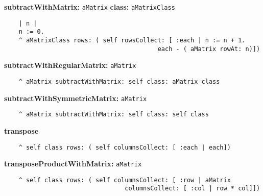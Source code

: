 {\bf subtractWithMatrix:} {\tt aMatrix} {\bf class:} {\tt aMatrixClass}
\begin{verbatim}
    | n |
    n := 0.
    ^ aMatrixClass rows: ( self rowsCollect: [ :each | n := n + 1. 
                                          each - ( aMatrix rowAt: n)])
\end{verbatim}
{\bf subtractWithRegularMatrix:} {\tt aMatrix}
\begin{verbatim}
    ^ aMatrix subtractWithMatrix: self class: aMatrix class
\end{verbatim}
{\bf subtractWithSymmetricMatrix:} {\tt aMatrix}
\begin{verbatim}
    ^ aMatrix subtractWithMatrix: self class: self class
\end{verbatim}
{\bf transpose}
\begin{verbatim}
    ^ self class rows: ( self columnsCollect: [ :each | each])
\end{verbatim}
{\bf transposeProductWithMatrix:} {\tt aMatrix}
\begin{verbatim}
    ^ self class rows: ( self columnsCollect: [ :row | aMatrix 
                                 columnsCollect: [ :col | row * col]])
\end{verbatim}

